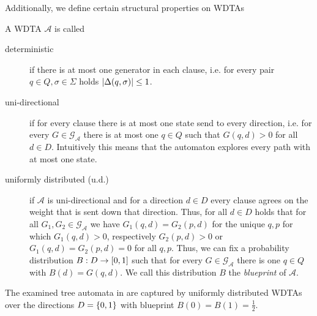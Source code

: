 Additionally, we define certain structural properties on \acp{WDTA}
\begin{definition}
  A \ac{WDTA} $\mathcal{A}$ is called
  \begin{description}
    \item [deterministic] if there is at most one generator in each clause, i.e.
      for every pair $q\in Q, \sigma\in\Sigma$ holds
      $\left\vert{\Delta(q, \sigma)}\right\vert \leq 1$.
    \item [uni-directional] if for every clause there is at most one state send
      to every direction, i.e. for every $G\in\mathcal{G}_{\mathcal{A}}$
      there is at most one $q\in Q$ such that $G(q, d) > 0$ for all
      $d\in D$. Intuitively this means that the automaton explores every path
      with at most one state.
    \item [uniformly distributed (u.d.)] if $\mathcal{A}$ is uni-directional
      and for a direction $d\in D$ every clause agrees on the weight that is
      sent down that direction. Thus, for all $d\in D$ holds that for all
      $G_{1}, G_{2}\in\mathcal{G}_{\mathcal{A}}$ we have
      $G_{1}(q, d) = G_{2}(p, d)$ for the unique $q, p$ for which
      $G_{1}(q, d) > 0$, respectively $G_{2}(p, d) > 0$ or
      $G_{1}(q, d) = G_{2}(p, d) = 0$ for all $q, p$. Thus, we can fix a
      probability distribution $B:D\rightarrow \left[0,1\right]$ such that for
      every $G\in\mathcal{G}_{\mathcal{A}}$ there is one $q\in Q$ with
      $B(d) = G(q, d)$. We call this distribution $B$ the \emph{blueprint} of
      $\mathcal{A}$. 
  \end{description}
\end{definition}
The examined tree automata in \cite{RandAutoInfTrees} are captured by
uniformly distributed \acp{WDTA} over the directions $D = \left\{0,1\right\}$ with
blueprint $B(0) = B(1) = \frac{1}{2}$.

